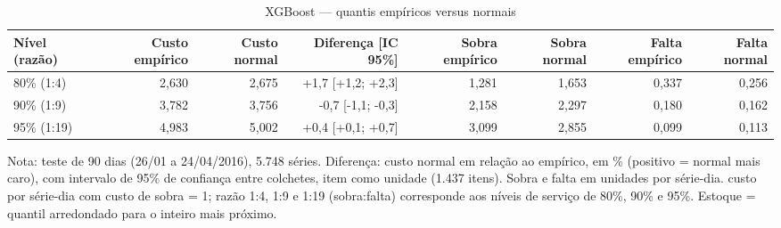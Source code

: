 \begin{table}[htbp]
\centering
\small
\caption{XGBoost — quantis empíricos versus normais}
\label{tab:xgb_empirico_vs_normal}
\begin{tabular}{lrrrrrrr}
\toprule
Nível (razão) & Custo empírico & Custo normal & Diferença [IC 95\%] & Sobra empírico & Sobra normal & Falta empírico & Falta normal \\
\midrule
80\% (1:4) & 2,630 & 2,675 & +1,7 [+1,2; +2,3] & 1,281 & 1,653 & 0,337 & 0,256 \\
90\% (1:9) & 3,782 & 3,756 & -0,7 [-1,1; -0,3] & 2,158 & 2,297 & 0,180 & 0,162 \\
95\% (1:19) & 4,983 & 5,002 & +0,4 [+0,1; +0,7] & 3,099 & 2,855 & 0,099 & 0,113 \\
\bottomrule
\end{tabular}
\par\smallskip
{\footnotesize Nota: teste de 90 dias (26/01 a 24/04/2016), 5.748 séries. Diferença: custo normal em relação ao empírico, em \% (positivo = normal mais caro), com intervalo de 95\% de confiança entre colchetes, item como unidade (1.437 itens). Sobra e falta em unidades por série-dia. custo por série-dia com custo de sobra = 1; razão 1:4, 1:9 e 1:19 (sobra:falta) corresponde aos níveis de serviço de 80\%, 90\% e 95\%. Estoque = quantil arredondado para o inteiro mais próximo.}
\end{table}

